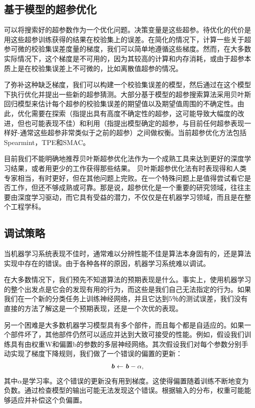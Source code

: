 \subsection{基于模型的超参优化}
可以将搜索好的超参数作为一个优化问题。决策变量是这些超参。待优化的代价是用这些超参训练获得的结果在校验集上的误差。在简化的情况下，计算一些关于超参可微的校验集误差度量的梯度，我们可以简单地遵循这些梯度\citep{bengio:1999:snowbird,bengio-hyper-NC00,maclaurin2015gradient}。然而，在大多数实际情况下，这个梯度是不可用的，因为其较高的计算和内存消耗，或由于超参本质上是在校验集误差上不可微的，比如离散值超参的情况。

了弥补这种缺乏梯度，我们可以构建一个校验集误差的模型，然后通过在这个模型下执行优化并提出一些新的超参猜测。大部分基于模型的超参搜索算法采用贝叶斯回归模型来估计每个超参的校验集误差的期望值以及期望值周围的不确定性。由此，优化需要在探索（指提出具有高度不确定性的超参，这可能导致大幅度的改进，但也可能表现不佳）和利用（指提出模型确定的超参，与目前任何超参表现一样好-通常这些超参非常类似于之前的超参）之间做权衡。当前超参优化方法包括Spearmint\citep{Snoek+al-NIPS2012-small}，TPE\citep{Bergstra+al-NIPS2011}和SMAC\citep{hutter+hoos+leyton+brown:2011}。

目前我们不能明确地推荐贝叶斯超参优化法作为一个成熟工具来达到更好的深度学习结果，或者用更少的工作获得那些结果。 贝叶斯超参优化法有时表现得和人类专家相当，有时更好，但在其他问题上完败。在一个特殊问题上是值得尝试看它是否工作，但还不够成熟或可靠。那是说，超参优化是一个重要的研究领域，往往主要由深度学习驱动，而它具有受益的潜力，不仅仅是在机器学习领域，而且是在整个工程学科。

\subsection{调试策略}
当机器学习系统表现不佳时，通常难以分辨性能不佳是算法本身固有的，还是算法实现中存在的错误。由于各种各样的原因，机器学习系统难以调试。

在大多数情况下，我们预先不知道算法的预期表现是什么。事实上，使用机器学习的整个出发点是它会的发现有用的行为，而这些是我们自己无法指定的行为。如果我们在一个新的分类任务上训练神经网络，并且它达到5％的测试误差，我们没有直接的方法了解这是一个预期表现，还是一个次优的表现。

另一个困难是大多数机器学习模型具有多个部件，而且每个都是自适应的。如果一个部件坏了，其他部件仍然可以适应并达到大致可接受的性能。例如，假设我们训练具有由权重W和偏置b的参数的多层神经网络。其次假设我们对每个参数分别手动实现了梯度下降规则，我们做了一个错误的偏置的更新：
\begin{equation}
    \boldsymbol{\mathit{b}} \leftarrow \boldsymbol{\mathit{b}} - \alpha,
\end{equation}
其中$\alpha$是学习率。这个错误的更新没有用到梯度。这使得偏置随着训练不断地变为负数。通过检查模型的输出可能无法发现这个错误。根据输入的分布，权重可能能够适应并补偿这个负偏置。

